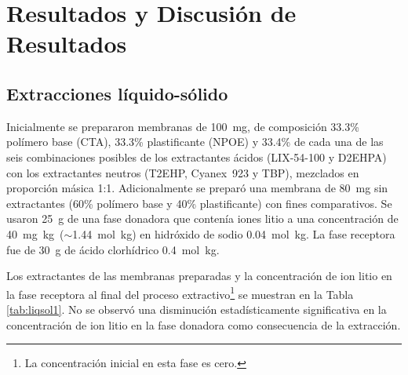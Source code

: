 \chapter{Resultados y Discusión de Resultados}

\section{Extracciones líquido-sólido}\label{sec:Resultsliqsol}
Inicialmente se prepararon membranas de 100~mg, de composición 33.3\% polímero base (CTA), 33.3\% plastificante (NPOE) y 33.4\% de cada una de las seis combinaciones posibles de los extractantes ácidos (LIX-54-100 y D2EHPA) con los extractantes neutros (T2EHP, Cyanex~923 y TBP), mezclados en proporción másica 1:1. Adicionalmente se preparó una membrana de 80~mg sin extractantes (60\% polímero base y 40\% plastificante) con fines comparativos. Se usaron 25~g de una fase donadora que contenía iones litio a una concentración de 40~mg~kg\mnn\ ($\sim$1.44~mol~kg\mnn) en hidróxido de sodio 0.04~mol~kg\mnn. La fase receptora fue de 30~g de ácido clorhídrico 0.4~mol~kg\mnn.

Los extractantes de las membranas preparadas y la concentración de ion litio en la fase receptora al final del proceso extractivo\footnote{La concentración inicial en esta fase es cero.} se muestran en la Tabla \ref{tab:liqsol1}. No se observó una disminución estadísticamente significativa en la concentración de ion litio en la fase donadora como consecuencia de la extracción. 

